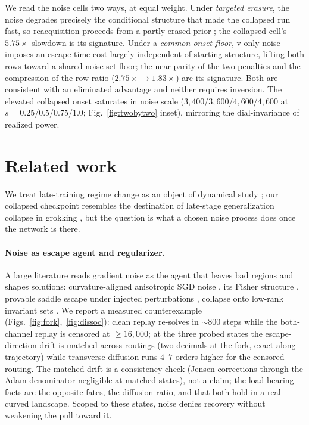 \documentclass[10pt]{article}
\begin{document}
We read the noise cells two ways, at equal weight. Under \emph{targeted erasure},
the noise degrades precisely the conditional structure that made the collapsed run
fast, so reacquisition proceeds from a partly-erased prior \citep{dohare}; the
collapsed cell's $5.75\times$ slowdown is its signature. Under a \emph{common
onset floor}, v-only noise imposes an escape-time cost largely independent of
starting structure, lifting both rows toward a shared noise-set floor; the
near-parity of the two penalties and the compression of the row ratio
($2.75\times\!\to\!1.83\times$) are its signature. Both are consistent with an
eliminated advantage and neither requires inversion. The elevated collapsed onset
saturates in noise scale ($3{,}400$/$3{,}600$/$4{,}600$/$4{,}600$ at
$s{=}0.25$/$0.5$/$0.75$/$1.0$; Fig.~\ref{fig:twobytwo} inset), mirroring the
dial-invariance of realized power.


\section{Related work}
\label{sec:related}

We treat late-training regime change as an object of dynamical study
\citep{position}; our collapsed checkpoint resembles the destination of late-stage
generalization collapse in grokking \citep{antigrok}, but the question is what a
chosen noise process does once the network is there.

\paragraph{Noise as escape agent and regularizer.}
A large literature reads gradient noise as the agent that leaves bad regions and
shapes solutions: curvature-aligned anisotropic SGD noise \citep{zhu}, its Fisher
structure \citep{wenfisher}, provable saddle escape under injected perturbations
\citep{saddle}, collapse onto low-rank invariant sets \citep{stochcollapse}. We
report a measured counterexample (Figs.~\ref{fig:fork},~\ref{fig:dissoc}): clean
replay re-solves in ${\sim}800$ steps while the both-channel replay is censored at
${\ge}16{,}000$; at the three probed states the escape-direction drift is matched
across routings (two decimals at the fork, exact along-trajectory) while
transverse diffusion runs $4$--$7$ orders higher for the censored routing. The
matched drift is a consistency check (Jensen corrections through the Adam
denominator negligible at matched states), not a claim; the load-bearing facts are
the opposite fates, the diffusion ratio, and that both hold in a real curved
landscape. Scoped to these states, noise denies recovery without weakening the
pull toward it.
\end{document}
